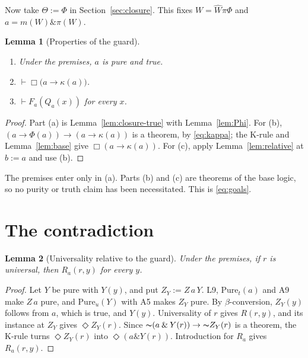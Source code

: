 \documentclass[12pt,leqno]{article}
\newcommand{\AND}{\ensuremath{\mathbin{\&}}}
\newcommand{\IC}{\ensuremath{\rightarrow}}
\newcommand{\NOT}{\ensuremath{\text{$\thicksim$}}}
\newcommand{\dentails}{\ensuremath{\vdash}}
\newcommand{\Pure}{\ensuremath{\mathrm{Pure}}}
\newcommand{\hW}{\ensuremath{\widehat{W}}}
\theoremstyle{plain}
\newtheorem{lemma}{Lemma}
\begin{document}
Now take \(\Theta:=\Phi\) in Section~\ref{sec:closure}. This fixes
\(W=\hW\pi\Phi\) and \(a=m(W)\AND\pi(W)\).

\begin{lemma}[Properties of the guard]\label{lem:guard}
\begin{enumerate}
\item[(a)] Under the premises, \(a\) is pure and true.
\item[(b)] \(\dentails\Box\bigl(a\IC\kappa(a)\bigr)\).
\item[(c)] \(\dentails F_a(Q_a(x))\) for every \(x\).
\end{enumerate}
\end{lemma}
\begin{proof}
Part (a) is Lemma~\ref{lem:closure-true} with Lemma~\ref{lem:Phi}. For
(b), \((a\IC\Phi(a))\IC(a\IC\kappa(a))\) is a theorem, by
\eqref{eq:kappa}; the K-rule and Lemma~\ref{lem:base} give
\(\Box(a\IC\kappa(a))\). For (c), apply Lemma~\ref{lem:relative} at
\(b:=a\) and use (b).
\end{proof}

The premises enter only in (a). Parts (b) and (c) are theorems of the
base logic, so no purity or truth claim has been necessitated. This is
\eqref{eq:goals}.

\section{The contradiction}\label{sec:final}

\begin{lemma}[Universality relative to the guard]\label{lem:step1}
Under the premises, if \(r\) is universal, then \(R_a(r,y)\) for every
\(y\).
\end{lemma}
\begin{proof}
Let \(Y\) be pure with \(Y(y)\), and put \(Z_Y:=Z\,a\,Y\). L9,
\(\Pure_t(a)\) and A9 make \(Z\,a\) pure, and \(\Pure_u(Y)\) with A5
makes \(Z_Y\) pure. By \(\beta\)-conversion, \(Z_Y(y)\) follows from
\(a\), which is true, and \(Y(y)\). Universality of \(r\) gives
\(R(r,y)\), and its instance at \(Z_Y\) gives \(\Diamond Z_Y(r)\).
Since \(\NOT(a\AND Y(r))\IC\NOT Z_Y(r)\) is a theorem, the K-rule turns
\(\Diamond Z_Y(r)\) into \(\Diamond(a\AND Y(r))\). Introduction for
\(R_a\) gives \(R_a(r,y)\).
\end{proof}
\end{document}
